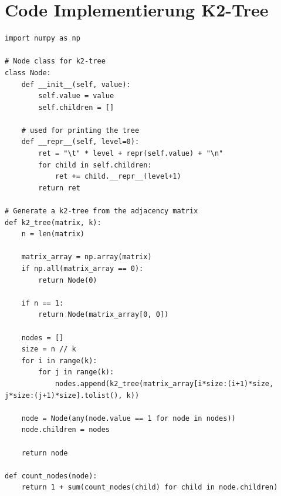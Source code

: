 \documentclass{ffhsthesis}
\begin{document}
\section{Code Implementierung K2-Tree}
\label{code:k2tree}
\begin{verbatim}
import numpy as np

# Node class for k2-tree
class Node:
    def __init__(self, value):
        self.value = value
        self.children = []

    # used for printing the tree
    def __repr__(self, level=0):
        ret = "\t" * level + repr(self.value) + "\n"
        for child in self.children:
            ret += child.__repr__(level+1)
        return ret

# Generate a k2-tree from the adjacency matrix
def k2_tree(matrix, k):
    n = len(matrix)

    matrix_array = np.array(matrix)
    if np.all(matrix_array == 0):
        return Node(0)

    if n == 1:
        return Node(matrix_array[0, 0])

    nodes = []
    size = n // k
    for i in range(k):
        for j in range(k):
            nodes.append(k2_tree(matrix_array[i*size:(i+1)*size, j*size:(j+1)*size].tolist(), k))

    node = Node(any(node.value == 1 for node in nodes))
    node.children = nodes

    return node

def count_nodes(node):
    return 1 + sum(count_nodes(child) for child in node.children)
\end{verbatim}
\end{document}
